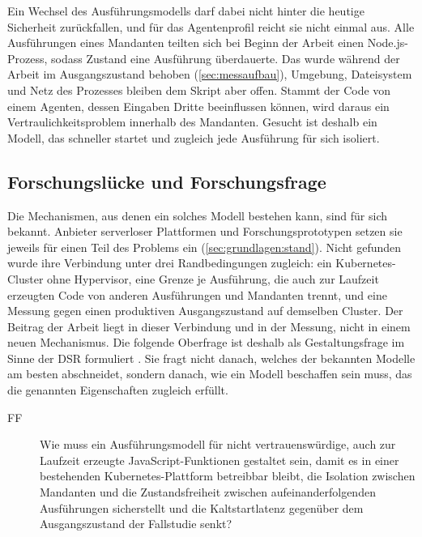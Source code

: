 Ein Wechsel des Ausführungsmodells darf dabei nicht hinter die heutige Sicherheit zurückfallen,
und für das Agentenprofil reicht sie nicht einmal aus. Alle Ausführungen eines Mandanten teilten
sich bei Beginn der Arbeit einen Node.js-Prozess, sodass Zustand eine Ausführung überdauerte. Das wurde während der Arbeit im Ausgangszustand
behoben (\autoref{sec:messaufbau}), Umgebung, Dateisystem und Netz des Prozesses bleiben dem Skript aber offen. Stammt der Code von
einem Agenten, dessen Eingaben Dritte beeinflussen können, wird daraus ein Vertraulichkeitsproblem
innerhalb des Mandanten.
Gesucht ist deshalb ein Modell, das schneller startet und zugleich jede Ausführung für sich
isoliert.

\subsection{Forschungslücke und Forschungsfrage}
\label{sec:einleitung:forschungsfrage}

Die Mechanismen, aus denen ein solches Modell bestehen kann, sind für sich bekannt. Anbieter serverloser
Plattformen und Forschungsprototypen setzen sie jeweils für einen Teil des Problems ein
(\autoref{sec:grundlagen:stand}). Nicht gefunden wurde ihre Verbindung unter drei Randbedingungen zugleich:
ein Kubernetes-Cluster ohne Hypervisor, eine Grenze je Ausführung, die auch zur Laufzeit erzeugten Code von anderen
Ausführungen und Mandanten trennt, und eine Messung gegen einen produktiven Ausgangszustand auf demselben Cluster. Der
Beitrag der Arbeit liegt in dieser Verbindung und in der Messung, nicht in einem neuen Mechanismus.
Die folgende Oberfrage ist deshalb als
Gestaltungsfrage im Sinne der \ac{DSR} formuliert \autocite[S.~664--667]{osterle_memorandum_2010}. Sie
fragt nicht danach, welches der bekannten Modelle am besten abschneidet, sondern danach, wie
ein Modell beschaffen sein muss, das die genannten Eigenschaften zugleich erfüllt.

\begin{description}
  \item[FF] Wie muss ein Ausführungsmodell für nicht vertrauenswürdige, auch zur Laufzeit erzeugte
    JavaScript-Funktionen gestaltet sein, damit es in einer bestehenden Kubernetes-Plattform
    betreibbar bleibt, die Isolation zwischen Mandanten und die Zustandsfreiheit zwischen
    aufeinanderfolgenden Ausführungen sicherstellt und die Kaltstartlatenz gegenüber
    dem Ausgangszustand der Fallstudie senkt?
\end{description}



